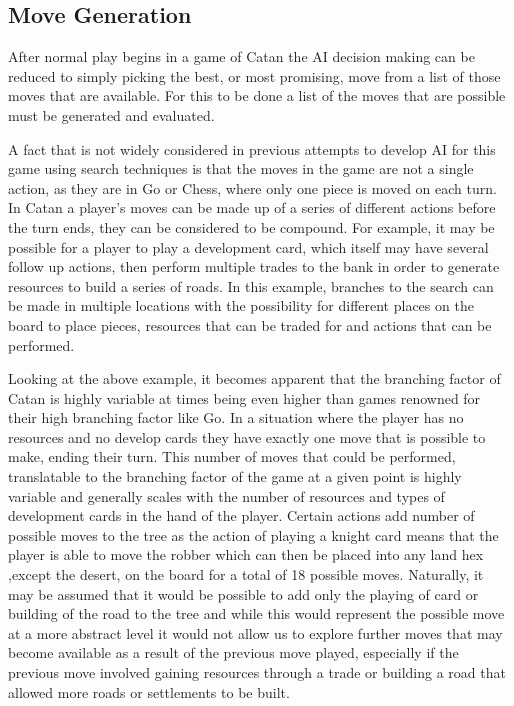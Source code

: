 \documentclass[]{article}
\begin{document}
\subsection{Move Generation}

After normal play begins in a game of Catan the AI decision making can be reduced to simply picking the best, or most promising, move from a list of those moves that are available. For this to be done a list of the moves that are possible must be generated and evaluated.

\par A fact that is not widely considered in previous attempts to develop AI for this game using search techniques is that the moves in the game are not a single action, as they are in Go or Chess, where only one piece is moved on each turn. In Catan a player's moves can be made up of a series of different actions before the turn ends, they can be considered to be compound. For example, it may be possible for a player to play a development card, which itself may have several follow up actions, then perform multiple trades to the bank in order to generate resources to build a series of roads. In this example, branches to the search can be made in multiple locations with the possibility for different places on the board to place pieces, resources that can be traded for and actions that can be performed.

\par Looking at the above example, it becomes apparent that the branching factor of Catan is highly variable at times being even higher than games renowned for their high branching factor like Go. In a situation where the player has no resources and no develop cards they have exactly one move that is possible to make, ending their turn. This number of moves that could be performed, translatable to the branching factor of the game at a given point is highly variable and generally scales with the number of resources and types of development cards in the hand of the player. Certain actions add number of possible moves to the tree as the action of playing a knight card means that the player is able to move the robber which can then be placed into any land hex ,except the desert, on the board for a total of 18 possible moves. Naturally, it may be assumed that it would be possible to add only the playing of card or building of the road to the tree and while this would represent the possible move at a more abstract level it would not allow us to explore further moves that may become available as a result of the previous move played, especially if the previous move involved gaining resources through a trade or building a road that allowed more roads or settlements to be built.
\end{document}
